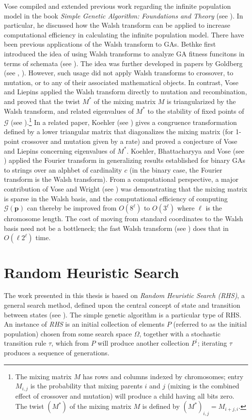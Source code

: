 Vose compiled and extended previous work regarding the infinite population model in the book 
\textit{Simple Genetic Algorithm: Foundations and Theory} (see \cite{Vose1999}). 
In particular, he discussed how the Walsh transform can be applied to increase 
computational efficiency in calculating the infinite population model. 
There have been previous applications of the Walsh transform to GAs. Bethke first introduced the 
idea of using Walsh transforms to analyze GA fitness funcitons in terms of schemata (see \cite{Bethke1981}). 
The idea was further developed in papers by Goldberg (see \cite{Goldberg1989a}, \cite{Goldberg1989b}). 
However, such usage did not apply Walsh transforms  to crossover, to mutation, or to any of their 
associated mathematical objects. In contrast, Vose and Liepins applied the Walsh transform directly to mutation and recombination, and proved that the 
twist $M^\ast$ of the mixing matrix $M$ is triangularized by the Walsh transform, and 
related eigenvalues of $M^\ast$ to the stability of fixed points of $\mathcal{G}$ (see \cite{VoseLiepins1991}).\footnote{The mixing 
matrix $M$ has rows and columns indexed by chromosomes; entry $M_{i,j}$ is the probability 
that mixing parents $i$ and $j$ (mixing is the combined effect of crossover and mutation) will produce a 
child having all bits zero. The twist $(M^\ast)$ of the mixing matrix $M$ is defined by $(M^\ast)_{i,j} = M_{i+j, i}$.} 
In a related paper, Koehler (see \cite{Koehler1994}) gives a congruence 
transformation defined by a lower triangular matrix that diagonalizes the mixing matrix (for 1-point crossover and mutation 
given by a rate) and proved a conjecture of Vose and Liepins concerning eigenvalues of $M^\ast$. Koehler, Bhattacharyya 
and Vose (see \cite{KoehlerBhatta1997}) applied the Fourier transform in generalizing results established 
for binary GAs to 
strings over an alphbet of cardinality $c$ (in the binary case, the Fourier transform is the Walsh transform). 
From a computational perspective, a major contribution of Vose and Wright (see \cite{VoseWright1998}) was demonstrating that 
the mixing matrix is sparse in the Walsh basis, and the computational efficiency of 
computing $\mathcal{G}(\bm{p})$ can thereby be improved from 
$O(8^\ell)$ to $O(3^\ell)$ where $\ell$ is the chromosome length. The cost of moving from standard coordinates to the Walsh basis need not be a bottleneck; 
the fast Walsh transform (see \cite{Shanks1969}) does that in $O(\ell 2^\ell)$ time.

\section{Random Heuristic Search}
The work presented in this thesis is based on {\em Random Heuristic Search (RHS)}, 
a general search method, defined upon the central concept of state and transition 
between states (see \cite{Vose1999}). The simple genetic algorithm is a particular type of RHS. 
An instance of {\em RHS} is an initial collection of elements $P$ (referred to as the initial population) chosen 
from some search space $\Omega$, together with a stochastic transition rule $\tau$, which from $P$ will 
produce another collection $P^\prime$; iterating $\tau$ produces a sequence of generations.

